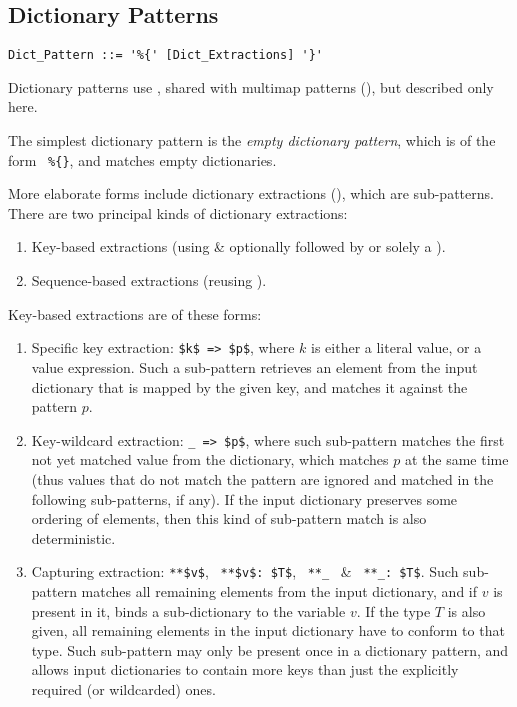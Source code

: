 \subsection{Dictionary Patterns}
\label{sec:dict-patterns}

\syntax\begin{lstlisting}
Dict_Pattern ::= '%{' [Dict_Extractions] '}'
\end{lstlisting}

Dictionary patterns use , shared with multimap patterns (), but described only here. 

The simplest dictionary pattern is the {\em empty dictionary pattern}, which is of the form ~\lstinline!%{}!, and matches empty dictionaries. 

More elaborate forms include dictionary extractions (), which are sub-patterns. There are two principal kinds of dictionary extractions:
\begin{enumerate}
  \item Key-based extractions (using  \& optionally followed by or solely a ). 
  \item Sequence-based extractions (reusing ). 
\end{enumerate}

Key-based extractions are of these forms:
\begin{enumerate}
  \item Specific key extraction: \lstinline!$k$ => $p$!, where $k$ is either a literal value, or a value expression. Such a sub-pattern retrieves an element from the input dictionary that is mapped by the given key, and matches it against the pattern $p$. 
  \item Key-wildcard extraction: \lstinline!_ => $p$!, where such sub-pattern matches the first not yet matched value from the dictionary, which matches $p$ at the same time (thus values that do not match the pattern are ignored and matched in the following sub-patterns, if any). If the input dictionary preserves some ordering of elements, then this kind of sub-pattern match is also deterministic. 
  \item Capturing extraction: \lstinline!**$v$!, ~\lstinline!**$v$: $T$!, ~\lstinline!**_!~ \& ~\lstinline!**_: $T$!. Such sub-pattern matches all remaining elements from the input dictionary, and if $v$ is present in it, binds a sub-dictionary to the variable $v$. If the type $T$ is also given, all remaining elements in the input dictionary have to conform to that type. Such sub-pattern may only be present once in a dictionary pattern, and allows input dictionaries to contain more keys than just the explicitly required (or wildcarded) ones. 
\end{enumerate}

